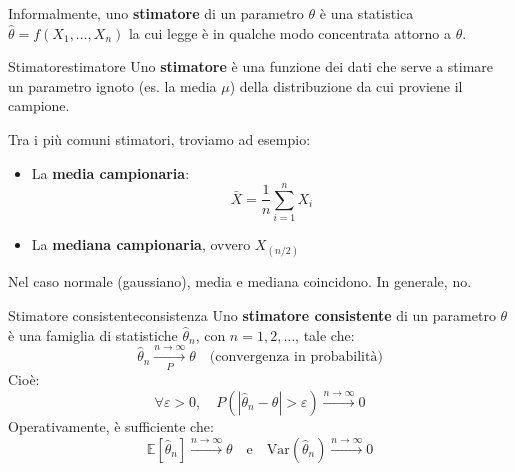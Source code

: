 Informalmente, uno \textbf{stimatore} di un parametro \( \theta \) è una statistica \( \hat{\theta} = f(X_1, \dots, X_n) \) la cui legge è in qualche modo concentrata attorno a \( \theta \).

\begin{definizione}{Stimatore}{stimatore}
Uno \textbf{stimatore} è una funzione dei dati che serve a stimare un parametro ignoto (es. la media \( \mu \)) della distribuzione da cui proviene il campione.
\end{definizione}

Tra i più comuni stimatori, troviamo ad esempio:
\begin{itemize}
  \item La \textbf{media campionaria}:
  \[
  \bar{X} = \frac{1}{n} \sum_{i=1}^n X_i
  \]
  \item La \textbf{mediana campionaria}, ovvero \( X_{(n/2)} \)
\end{itemize}
Nel caso normale (gaussiano), media e mediana coincidono. In generale, no.

\begin{definizione}{Stimatore consistente}{consistenza}
Uno \textbf{stimatore consistente} di un parametro \( \theta \) è una famiglia di statistiche \( \hat{\theta}_n \), con \( n = 1, 2, \dots \), tale che:
\[
    \hat{\theta}_n \xrightarrow[P]{n \to \infty} \theta \quad \text{(convergenza in probabilità)}
\]
Cioè:
\[
\forall \varepsilon > 0, \quad P(|\hat{\theta}_n - \theta| > \varepsilon) \xrightarrow{n \to \infty} 0
\]
Operativamente, è sufficiente che:
\[
\mathbb{E}[\hat{\theta}_n] \xrightarrow{n \to \infty} \theta \quad \text{e} \quad \text{Var}(\hat{\theta}_n) \xrightarrow{n \to \infty} 0
\]
\end{definizione}

